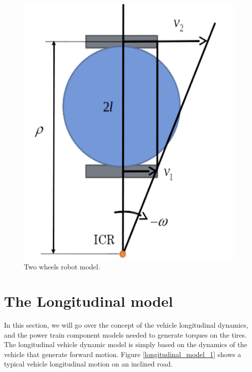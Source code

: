 \begin{figure}[!htb]
\begin{center}
\includegraphics[scale=0.290]{img/kinematics/icr_II.jpeg}
\end{center}
\caption{Two wheels robot model.}
\label{icr_II}
\end{figure}

\section{The Longitudinal model}
\label{longitudinal_model}

In this section, we will go over the concept of the vehicle longitudinal dynamics, and the power train component models needed to generate torques on the tires. 
The longitudinal vehicle dynamic model is simply based on the dynamics of the vehicle that generate forward motion. Figure \ref{longitudinal_model_1} shows a typical vehicle longitudinal motion on an inclined road. 

